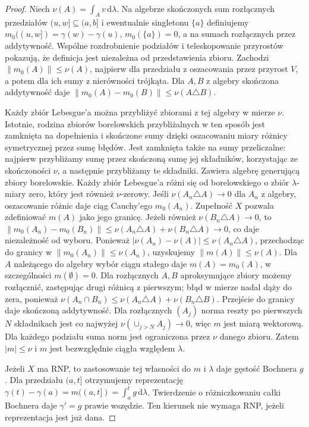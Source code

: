 \begin{proof}
Niech $\nu(A)=\int_Av\,\mathrm d\lambda$. Na algebrze
skończonych sum rozłącznych przedziałów $(u,w]\subseteq
(a,b]$ i ewentualnie singletonu $\{a\}$ definiujemy
$m_0((u,w])=\gamma(w)-\gamma(u)$, $m_0(\{a\})=0$,
a na sumach rozłącznych przez addytywność. Wspólne
rozdrobnienie podziałów i teleskopowanie przyrostów
pokazują, że definicja jest niezależna od przedstawienia
zbioru. Zachodzi $\|m_0(A)\|\le\nu(A)$, najpierw dla
przedziału z oszacowania przez przyrost $V$, a potem
dla ich sumy z nierówności trójkąta.
Dla $A,B$ z algebry skończona addytywność daje
$\|m_0(A)-m_0(B)\|\le\nu(A\triangle B)$.

Każdy zbiór Lebesgue'a można przybliżyć zbiorami
z tej algebry w mierze $\nu$. Istotnie, rodzina zbiorów
borelowskich przybliżalnych w ten sposób jest zamknięta
na dopełnienia i skończone sumy dzięki oszacowaniu
miary różnicy symetrycznej przez sumę błędów.
Jest zamknięta także na sumy przeliczalne: najpierw
przybliżamy sumę przez skończoną sumę jej składników,
korzystając ze skończoności $\nu$, a następnie
przybliżamy te składniki. Zawiera algebrę generującą
zbiory borelowskie. Każdy zbiór Lebesgue'a różni się
od borelowskiego o zbiór $\lambda$-miary zero, który
jest również $\nu$-zerowy.
Jeśli $\nu(A_n\triangle A)\to0$ dla $A_n$ z algebry,
oszacowanie różnic daje ciąg Cauchy'ego $m_0(A_n)$.
Zupełność $X$ pozwala zdefiniować $m(A)$ jako jego
granicę. Jeżeli również $\nu(B_n\triangle A)\to0$, to
$\|m_0(A_n)-m_0(B_n)\|\le
\nu(A_n\triangle A)+\nu(B_n\triangle A)\to0$,
co daje niezależność od wyboru. Ponieważ
$|\nu(A_n)-\nu(A)|\le\nu(A_n\triangle A)$,
przechodząc do granicy w $\|m_0(A_n)\|\le\nu(A_n)$,
uzyskujemy $\|m(A)\|\le\nu(A)$. Dla $A$ należącego
do algebry wybór ciągu stałego daje $m(A)=m_0(A)$,
w szczególności $m(\emptyset)=0$.
Dla rozłącznych $A,B$ aproksymujące zbiory możemy
rozłącznić, zastępując drugi różnicą z pierwszym;
błąd w mierze nadal dąży do zera, ponieważ
$\nu(A_n\cap B_n)\le\nu(A_n\triangle A)+\nu(B_n\triangle B)$.
Przejście do granicy daje skończoną addytywność.
Dla rozłącznych $(A_j)$ norma reszty po pierwszych $N$
składnikach jest co najwyżej $\nu(\cup_{j>N}A_j)\to0$,
więc $m$ jest miarą wektorową. Dla każdego podziału
suma norm jest ograniczona przez $\nu$ danego zbioru.
Zatem $|m|\le\nu$ i $m$ jest bezwzględnie ciągła
względem $\lambda$.

Jeżeli $X$ ma RNP, to zastosowanie tej własności
do $m$ i $\lambda$ daje gęstość Bochnera $g$. Dla przedziału $(a,t]$ otrzymujemy reprezentację
$\gamma(t)-\gamma(a)=m((a,t])=\int_a^t g\,\mathrm d\lambda$.
Twierdzenie o różniczkowaniu całki Bochnera daje
$\gamma'=g$ prawie wszędzie. Ten kierunek nie wymaga RNP,
jeżeli reprezentacja jest już dana.


\end{proof}
